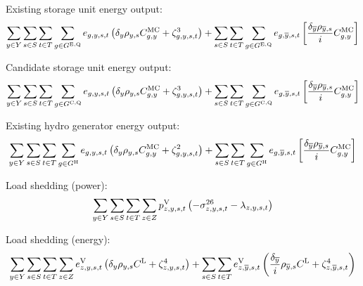 \documentclass{article}
\newcommand{\sGeneratorsHydro}{G^{\mathrm{H}}}
\newcommand{\sStorageExisting}{G^{\mathrm{E,Q}}}
\newcommand{\sStorageCandidate}{G^{\mathrm{C,Q}}}
\newcommand{\sScenarios}{S}
\newcommand{\sIntervals}{T}
\newcommand{\sZones}{Z}
\newcommand{\iGenerator}{g}
\newcommand{\iYear}{y}
\newcommand{\iYearTerminal}{\overline{\iYear}}
\newcommand{\iScenario}{s}
\newcommand{\iInterval}{t}
\newcommand{\iZone}{z}
\newcommand{\cScenarioDuration}[1][\iYear,\iScenario]{\rho_{#1}}
\newcommand{\cMarginalCost}[1][\iGenerator,\iYear]{C^{\mathrm{MC}}_{#1}}
\newcommand{\cInterestRate}{i}
\newcommand{\cLostLoadCost}{C^{\mathrm{L}}}
\newcommand{\cDiscountRate}[1][\iYear]{\delta_{#1}}
\newcommand{\vEnergy}[1][\iGenerator,\iYear,\iScenario,\iInterval]{e_{#1}}
\newcommand{\vLostLoadEnergy}[1][\iZone,\iYear,\iScenario,\iInterval]{e^{\mathrm{V}}_{#1}}
\newcommand{\vLostLoadPower}[1][\iZone,\iYear,\iScenario,\iInterval]{p^{\mathrm{V}}_{#1}}
\newcommand{\dNonNegativeLostLoad}[1][\iZone,\iYear,\iScenario,\iInterval]{\sigma_{#1}^{26}}
\newcommand{\dPowerBalance}[1][\iZone,\iYear,\iScenario,\iInterval]{\lambda_{#1}}
\newcommand{\dGeneratorEnergyOutput}[1][\iGenerator,\iYear,\iScenario,\iInterval]{\zeta_{#1}^{2}}
\newcommand{\dStorageEnergyOutput}[1][\iGenerator,\iYear,\iScenario,\iInterval]{\zeta_{#1}^{3}}
\newcommand{\dLostLoadEnergy}[1][\iZone,\iYear,\iScenario,\iInterval]{\zeta_{#1}^{4}}
\begin{document}
Existing storage unit energy output:
\begin{equation}
	\sumIntervals \sum\limits_{\iGenerator \in \sStorageExisting} \vEnergy \left(\cDiscountRate\cScenarioDuration \cMarginalCost + \dStorageEnergyOutput \right) + \sum\limits_{\iScenario \in \sScenarios} \sum\limits_{\iInterval \in \sIntervals} \sum\limits_{\iGenerator \in \sStorageExisting} \vEnergy[\iGenerator,\iYearTerminal,\iScenario,\iInterval] \left[ \frac{\cDiscountRate[\iYearTerminal] \cScenarioDuration[\iYearTerminal,\iScenario]}{\cInterestRate} \cMarginalCost \right]
\end{equation}

Candidate storage unit energy output:
\begin{equation}
	\sumIntervals \sum\limits_{\iGenerator \in \sStorageCandidate} \vEnergy \left(\cDiscountRate\cScenarioDuration \cMarginalCost + \dStorageEnergyOutput \right) + \sum\limits_{\iScenario \in \sScenarios} \sum\limits_{\iInterval \in \sIntervals} \sum\limits_{\iGenerator \in \sStorageCandidate} \vEnergy[\iGenerator,\iYearTerminal,\iScenario,\iInterval] \left[ \frac{\cDiscountRate[\iYearTerminal] \cScenarioDuration[\iYearTerminal,\iScenario]}{\cInterestRate} \cMarginalCost \right]
\end{equation}

Existing hydro generator energy output:
\begin{equation}
	\sumIntervals \sum\limits_{\iGenerator \in \sGeneratorsHydro} \vEnergy \left(\cDiscountRate\cScenarioDuration \cMarginalCost + \dGeneratorEnergyOutput \right) + \sum\limits_{\iScenario \in \sScenarios} \sum\limits_{\iInterval \in \sIntervals} \sum\limits_{\iGenerator \in \sGeneratorsHydro} \vEnergy[\iGenerator,\iYearTerminal,\iScenario,\iInterval] \left[ \frac{\cDiscountRate[\iYearTerminal] \cScenarioDuration[\iYearTerminal,\iScenario]}{\cInterestRate} \cMarginalCost \right]
\end{equation}

Load shedding (power):
\begin{equation}
	\sumIntervals \sum\limits_{\iZone \in \sZones} \vLostLoadPower \left(- \dNonNegativeLostLoad - \dPowerBalance\right)
\end{equation}

Load shedding (energy):
\begin{equation}
	\sumIntervals \sum\limits_{\iZone \in \sZones} \vLostLoadEnergy \left(\cDiscountRate \cScenarioDuration \cLostLoadCost + \dLostLoadEnergy \right) + \sum\limits_{\iScenario \in \sScenarios}\sum\limits_{\iInterval \in \sIntervals} \vLostLoadEnergy[\iZone,\iYearTerminal,\iScenario,\iInterval] \left( \frac{\cDiscountRate[\iYearTerminal]}{\cInterestRate} \cScenarioDuration[\iYearTerminal,\iScenario] \cLostLoadCost + \dLostLoadEnergy[\iZone,\iYearTerminal,\iScenario,\iInterval] \right)
\end{equation}
\end{document}
